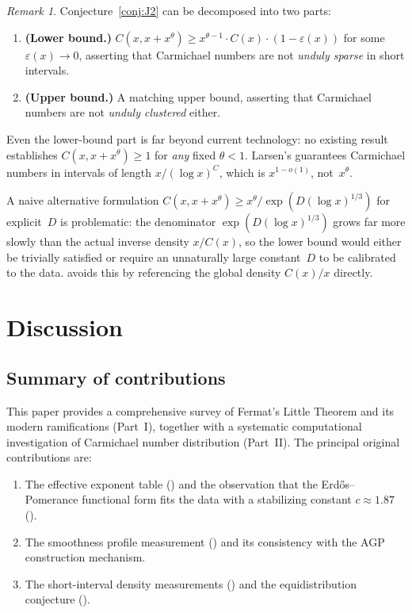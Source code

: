 \documentclass[12pt]{amsart}
\theoremstyle{plain}
\theoremstyle{definition}
\theoremstyle{remark}
\newtheorem{remark}[theorem]{Remark}
\begin{document}
\begin{remark}\label{rem:J2_discussion}
Conjecture~\ref{conj:J2} can be decomposed into two parts:
\begin{enumerate}
\item \textbf{(Lower bound.)} $C(x,x+x^{\theta})\ge
  x^{\theta-1}\cdot C(x)\cdot(1-\varepsilon(x))$ for some
  $\varepsilon(x)\to 0$, asserting that Carmichael numbers are not
  \emph{unduly sparse} in short intervals.
\item \textbf{(Upper bound.)} A matching upper bound, asserting that
  Carmichael numbers are not \emph{unduly clustered} either.
\end{enumerate}
Even the lower-bound part is far beyond current technology: no
existing result establishes $C(x,x+x^{\theta})\ge 1$ for \emph{any}
fixed $\theta<1$.  Larsen's  guarantees Carmichael
numbers in intervals of length $x/(\log x)^{C}$, which is
$x^{1-o(1)}$, not~$x^{\theta}$.

A naive alternative formulation
$C(x,x+x^{\theta})\ge x^{\theta}/\exp(D(\log x)^{1/3})$
for explicit~$D$ is problematic: the denominator $\exp(D(\log x)^{1/3})$
grows far more slowly than the actual inverse density $x/C(x)$, so
the lower bound would either be trivially satisfied or require an
unnaturally large constant~$D$ to be calibrated to the data.
 avoids this by referencing the global density
$C(x)/x$ directly.
\end{remark}


\section*{Discussion}\label{sec:discussion}

\subsection*{Summary of contributions}

This paper provides a comprehensive survey of Fermat's Little Theorem
and its modern ramifications (Part~I), together with a systematic
computational investigation of Carmichael number distribution
(Part~II).  The principal original contributions are:

\begin{enumerate}
\item The effective exponent table () and the
  observation that the Erd\H{o}s--Pomerance functional form fits the
  data with a stabilizing constant $c\approx 1.87$
  ().

\item The smoothness profile measurement () and its
  consistency with the AGP construction mechanism.

\item The short-interval density measurements () and
  the equidistribution conjecture ().
\end{enumerate}
\end{document}
